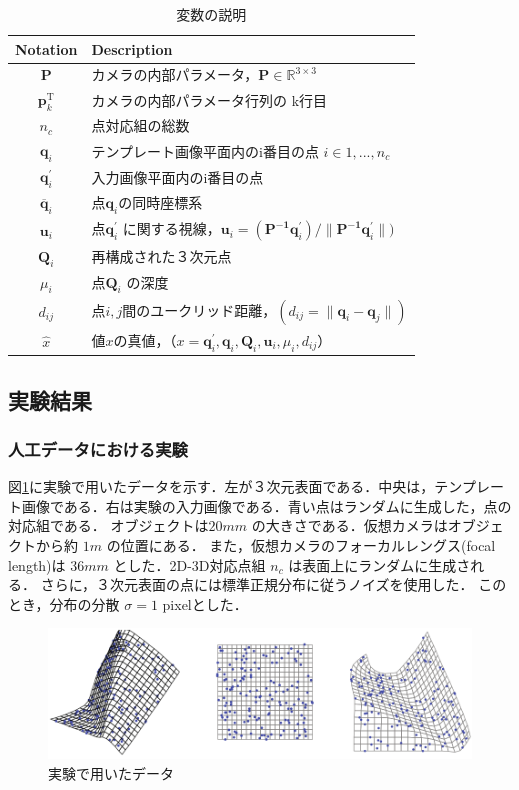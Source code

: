 \documentclass[10.5pt,twocolumn,a4j,fleqn]{ujarticle}
\def\figref#1{図\ref{#1}}
\begin{document}
\begin{table}[htb]
  \caption{変数の説明}
  \begin{tabular}{|c|l|} \hline
    Notation & Description \\ \hline
    $\bm{P}$ & カメラの内部パラメータ，$\bm{P} \in \mathbb{R}^{3\times3}$  \\
    $\bm{p}_k^{\mathrm{T}}$ & カメラの内部パラメータ行列の k行目  \\
    $n_c$ & 点対応組の総数 \\
    $\bm{q}_i$ & テンプレート画像平面内のi番目の点 $i \in {1, ... ,n_c}$ \\
    $\bm{q}_i^{\prime}$ & 入力画像平面内のi番目の点 \\
    $\overline{\bm{q}}_i$ & 点$\bm{q}_i$の同時座標系 \\
    $\bm{u}_i$ & 点$\bm{q}_i^{\prime}$ に関する視線，$\bm{u}_i = (\bm{P^{-1}} \bm{q}_i^{\prime}) / \| \bm{P^{-1}} \bm{q}_i^{\prime} \|)$ \\
    $\bm{Q}_i$ & 再構成された３次元点 \\
    $\mu_i$ & 点$\bm{Q}_i$ の深度 \\
    $d_{ij}$ & 点$i, j$間のユークリッド距離，$(d_{ij} = \|\bm{q}_i - \bm{q}_j\|)$ \\
    $\hat{x}$ & 値$x$の真値，（$x = \bm{q}_i^{\prime}, \bm{q}_i, \bm{Q}_i, \bm{u}_i, \mu_i, d_{ij}$） \\ \hline
  \end{tabular}
  \label{table1}
\end{table}


\subsection{実験結果}
\subsubsection{人工データにおける実験}
\figref{fig2}に実験で用いたデータを示す．左が３次元表面である．中央は，テンプレート画像である．右は実験の入力画像である．青い点はランダムに生成した，点の対応組である．
オブジェクトは$ 20 mm $ の大きさである．仮想カメラはオブジェクトから約 $1m$ の位置にある．
また，仮想カメラのフォーカルレングス(focal length)は $36mm$ とした．2D-3D対応点組 $n_c$ は表面上にランダムに生成される．
さらに，３次元表面の点には標準正規分布に従うノイズを使用した．
このとき，分布の分散 $\sigma = 1$ pixelとした．

\begin{figure}[htbp]
 \begin{center}
  \includegraphics[width=150mm]{img/fig2.png}
  \caption{実験で用いたデータ}
  \label{fig2}
 \end{center}
\end{figure}
\end{document}
